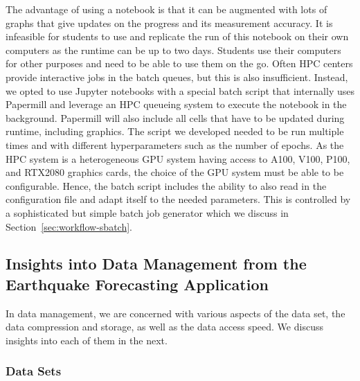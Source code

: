 \documentclass[utf8]{FrontiersinVancouver} %
\begin{document}
The advantage of using a notebook is that it can be augmented with
lots of graphs that give updates on the progress and its
measurement accuracy. It is infeasible for students to use and
replicate the run of this notebook on their own computers as the
runtime can be up to two days. Students use their computers for other 
purposes and need to be able to use them on the go. Often HPC centers 
provide interactive jobs in the batch queues, but this is also 
insufficient. Instead, we opted to use Jupyter notebooks with a special batch script that 
internally uses Papermill \citep{www-papermill} and leverage
an HPC queueing system to execute the notebook 
in the background. Papermill will also include all cells that have to be 
updated during runtime, including graphics. The script we developed 
needed to be run multiple times and with different 
hyperparameters such as the number of epochs.
As the HPC system is a heterogeneous GPU system having access to A100, 
V100, P100, and RTX2080 graphics cards, the choice of the GPU system must 
be able to be configurable. Hence, the batch script includes the ability 
to also read in the configuration file and adapt itself to the needed 
parameters. This is controlled by a sophisticated but simple batch job 
generator which we discuss in Section~\ref{sec:workflow-sbatch}.



\subsection{Insights into Data Management from the Earthquake Forecasting Application}
\label{sec:eq-data}

In data management, we are concerned with various aspects of
the data set, the data compression and storage, as well as the data
access speed. We discuss insights into each of them in the next.

\subsubsection{Data Sets}
\end{document}
